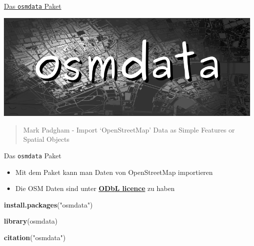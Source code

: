 \documentclass[ignorenonframetext,]{beamer}
\newenvironment{Shaded}{\begin{snugshade}}{\end{snugshade}}
\newcommand{\KeywordTok}[1]{\textcolor[rgb]{0.13,0.29,0.53}{\textbf{#1}}}
\newcommand{\NormalTok}[1]{#1}
\newcommand{\StringTok}[1]{\textcolor[rgb]{0.31,0.60,0.02}{#1}}
\providecommand{\tightlist}{%
  \setlength{\itemsep}{0pt}\setlength{\parskip}{0pt}}
\begin{document}
\begin{frame}{\href{https://github.com/ropensci/osmdata}{Das
\texttt{osmdata} Paket}}
\protect\hypertarget{das-osmdata-paket}{}

\includegraphics{figure/osmdatatitle.png}

\begin{quote}
Mark Padgham - Import `OpenStreetMap' Data as Simple Features or Spatial
Objects
\end{quote}

\end{frame}

\begin{frame}[fragile]{Das \texttt{osmdata} Paket}
\protect\hypertarget{das-osmdata-paket-1}{}

\begin{itemize}
\tightlist
\item
  Mit dem Paket kann man Daten von OpenStreetMap importieren
\item
  Die OSM Daten sind unter
  \href{https://www.openstreetmap.org/copyright}{\textbf{ODbL licence}}
  zu haben
\end{itemize}

\begin{Shaded}
\begin{Highlighting}[]
\KeywordTok{install.packages}\NormalTok{(}\StringTok{"osmdata"}\NormalTok{)}
\end{Highlighting}
\end{Shaded}

\begin{Shaded}
\begin{Highlighting}[]
\KeywordTok{library}\NormalTok{(osmdata)}
\end{Highlighting}
\end{Shaded}

\begin{Shaded}
\begin{Highlighting}[]
\KeywordTok{citation}\NormalTok{(}\StringTok{"osmdata"}\NormalTok{)}
\end{Highlighting}
\end{Shaded}

\end{frame}
\end{document}
